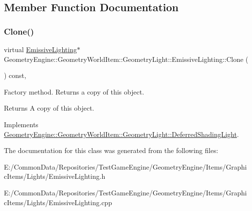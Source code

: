 \subsection{Member Function Documentation}
\mbox{\label{class_geometry_engine_1_1_geometry_world_item_1_1_geometry_light_1_1_emissive_lighting_ac7e3e90cadf700764fccdacc94238bac}} 
\subsubsection{\texorpdfstring{Clone()}{Clone()}}
{\footnotesize\ttfamily virtual \mbox{\hyperlink{class_geometry_engine_1_1_geometry_world_item_1_1_geometry_light_1_1_emissive_lighting}{Emissive\+Lighting}}$\ast$ Geometry\+Engine\+::\+Geometry\+World\+Item\+::\+Geometry\+Light\+::\+Emissive\+Lighting\+::\+Clone (\begin{DoxyParamCaption}{ }\end{DoxyParamCaption}) const\hspace{0.3cm}{\ttfamily [inline]}, {\ttfamily [virtual]}}

Factory method. Returns a copy of this object. \begin{DoxyReturn}{Returns}
A copy of this object. 
\end{DoxyReturn}


Implements \mbox{\hyperlink{class_geometry_engine_1_1_geometry_world_item_1_1_geometry_light_1_1_deferred_shading_light_a7ef4d7b7a41cbda01a55bcb0475484d3}{Geometry\+Engine\+::\+Geometry\+World\+Item\+::\+Geometry\+Light\+::\+Deferred\+Shading\+Light}}.



The documentation for this class was generated from the following files\+:\begin{DoxyCompactItemize}
\item 
E\+:/\+Common\+Data/\+Repositories/\+Test\+Game\+Engine/\+Geometry\+Engine/\+Items/\+Graphic\+Items/\+Lights/Emissive\+Lighting.\+h\item 
E\+:/\+Common\+Data/\+Repositories/\+Test\+Game\+Engine/\+Geometry\+Engine/\+Items/\+Graphic\+Items/\+Lights/Emissive\+Lighting.\+cpp\end{DoxyCompactItemize}
